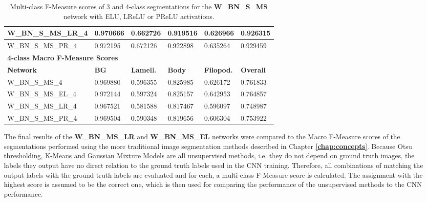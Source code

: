 \begin {table}
\begin{flushleft}
\begin {tabular}[!htb]{|l|l|l|l|l|l|}
			W\_BN\_S\_MS\_LR\_4& 0.970666& 0.662726& 0.919516& 0.626966& 0.926315 \\ \hline
			W\_BN\_S\_MS\_PR\_4& 0.972195& 0.672126& 0.922898& 0.635264& 0.929459 \\ \hline
			\multicolumn{6}{|l|}{\textbf{4-class Macro F-Measure Scores}} \\ \hline
			\textbf{Network}& \textbf{BG}& \textbf{Lamell.}& \textbf{Body}& \textbf{Filopod.}& \textbf{Overall} \\ \hline
			W\_BN\_S\_MS\_4& 0.969880& 0.596355& \cellcolor{green!25}0.825985& 0.626172& 0.761833 \\ \hline
			W\_BN\_S\_MS\_EL\_4& \cellcolor{green!25}0.972144& \cellcolor{green!25}0.597324& 0.825157& \cellcolor{green!25}0.642953& \cellcolor{green!25}0.764857 \\ \hline
			W\_BN\_S\_MS\_LR\_4& 0.967521& 0.581588& 0.817467& 0.596097& 0.748987 \\ \hline
			W\_BN\_S\_MS\_PR\_4& 0.969504& 0.590348& 0.819656& 0.606304& 0.753922 \\ \hline
		\end {tabular}
	\end {flushleft}
\caption[Multi-class F-Measure scores for networks with different activation functions.]{Multi-class F-Measure scores of 3 and 4-class segmentations for the \textbf{W\_BN\_S\_MS} network with ELU, LReLU or PReLU activations.}
\label{tab:results5}
\end {table}


\noindent The final results of the \textbf{W\_BN\_MS\_LR} and \textbf{W\_BN\_MS\_EL} networks were compared to the Macro F-Measure scores of the segmentations performed using the more traditional image segmentation methods described in Chapter \textbf{\ref{chap:concepts}}. Because Otsu thresholding, K-Means and Gaussian Mixture Models are all unsupervised methods, i.e. they do not depend on ground truth images, the labels they output have no direct relation to the ground truth labels used in the CNN training. Therefore, all combinations of matching the output labels with the ground truth labels are evaluated and for each, a multi-class F-Measure score is calculated. The assignment with the highest score is assumed to be the correct one, which is then used for comparing the performance of the unsupervised methods to the CNN performance.\\


